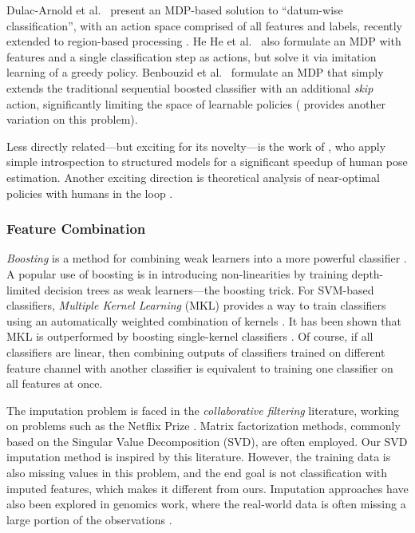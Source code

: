 Dulac-Arnold et al.\ \parencite{DulacArnold-ML-2012} present an MDP-based solution to ``datum-wise classification'', with an action space comprised of all features and labels, recently extended to region-based processing \parencite{DulacArnold-ICLR-2014}.
He He et al.\ \parencite{HeHe-ICMLW-2012} also formulate an MDP with features and a single classification step as actions, but solve it via imitation learning of a greedy policy.
Benbouzid et al.\ \parencite{Benbouzid-ICML-2012} formulate an MDP that simply extends the traditional sequential boosted classifier with an additional \emph{skip} action, significantly limiting the space of learnable policies (\parencite{Trapeznikov-ML-2012} provides another variation on this problem).

Less directly related---but exciting for its novelty---is the work of \parencite{Weiss-ICCV-2013}, who apply simple introspection to structured models for a significant speedup of human pose estimation.
Another exciting direction is theoretical analysis of near-optimal policies with humans in the loop \parencite{Chen-2014-ICML}.

\subsubsection{Feature Combination}

\emph{Boosting} is a method for combining weak learners into a more powerful classifier \parencite{Hastie2009}.
A popular use of boosting is in introducing non-linearities by training depth-limited decision trees as weak learners---the boosting trick.
For SVM-based classifiers, \emph{Multiple Kernel Learning} (MKL) provides a way to train classifiers using an automatically weighted combination of kernels \parencite{Lanckriet2004}.
It has been shown that MKL is outperformed by boosting single-kernel classifiers \parencite{Gehler2009}.
Of course, if all classifiers are linear, then combining outputs of classifiers trained on different feature channel with another classifier is equivalent to training one classifier on all features at once.

The imputation problem is faced in the \emph{collaborative filtering} literature, working on problems such as the Netflix Prize \cite{Koren-2009}.
Matrix factorization methods, commonly based on the Singular Value Decomposition (SVD), are often employed.
Our SVD imputation method is inspired by this literature.
However, the training data is also missing values in this problem, and the end goal is not classification with imputed features, which makes it different from ours.
Imputation approaches have also been explored in genomics work, where the real-world data is often missing a large portion of the observations \cite{Hastie-1999}.

